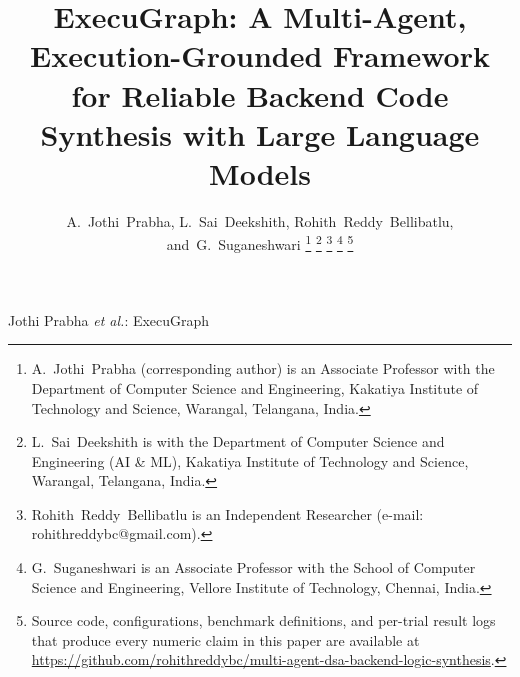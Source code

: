 \documentclass[journal]{IEEEtran}
\begin{document}
\title{ExecuGraph: A Multi-Agent, Execution-Grounded Framework for Reliable Backend Code Synthesis with Large Language Models}

\author{%
  A.~Jothi~Prabha,
  L.~Sai~Deekshith,
  Rohith~Reddy~Bellibatlu,
  and~G.~Suganeshwari%
  \thanks{A.~Jothi~Prabha (corresponding author) is an Associate Professor with the Department of Computer Science and Engineering, Kakatiya Institute of Technology and Science, Warangal, Telangana, India.}%
  \thanks{L.~Sai~Deekshith is with the Department of Computer Science and Engineering (AI \& ML), Kakatiya Institute of Technology and Science, Warangal, Telangana, India.}%
  \thanks{Rohith~Reddy~Bellibatlu is an Independent Researcher (e-mail: rohithreddybc@gmail.com).}%
  \thanks{G.~Suganeshwari is an Associate Professor with the School of Computer Science and Engineering, Vellore Institute of Technology, Chennai, India.}%
  \thanks{Source code, configurations, benchmark definitions, and per-trial result logs that produce every numeric claim in this paper are available at \url{https://github.com/rohithreddybc/multi-agent-dsa-backend-logic-synthesis}.}%
}

%
{Jothi Prabha \MakeLowercase{\textit{et al.}}: ExecuGraph}

\maketitle
\end{document}
